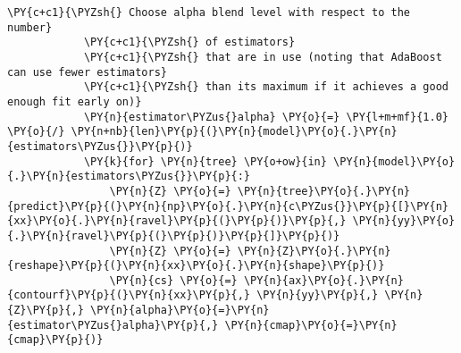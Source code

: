 \begin{Verbatim}[commandchars=\\\{\}]
            \PY{c+c1}{\PYZsh{} Choose alpha blend level with respect to the number}
            \PY{c+c1}{\PYZsh{} of estimators}
            \PY{c+c1}{\PYZsh{} that are in use (noting that AdaBoost can use fewer estimators}
            \PY{c+c1}{\PYZsh{} than its maximum if it achieves a good enough fit early on)}
            \PY{n}{estimator\PYZus{}alpha} \PY{o}{=} \PY{l+m+mf}{1.0} \PY{o}{/} \PY{n+nb}{len}\PY{p}{(}\PY{n}{model}\PY{o}{.}\PY{n}{estimators\PYZus{}}\PY{p}{)}
            \PY{k}{for} \PY{n}{tree} \PY{o+ow}{in} \PY{n}{model}\PY{o}{.}\PY{n}{estimators\PYZus{}}\PY{p}{:}
                \PY{n}{Z} \PY{o}{=} \PY{n}{tree}\PY{o}{.}\PY{n}{predict}\PY{p}{(}\PY{n}{np}\PY{o}{.}\PY{n}{c\PYZus{}}\PY{p}{[}\PY{n}{xx}\PY{o}{.}\PY{n}{ravel}\PY{p}{(}\PY{p}{)}\PY{p}{,} \PY{n}{yy}\PY{o}{.}\PY{n}{ravel}\PY{p}{(}\PY{p}{)}\PY{p}{]}\PY{p}{)}
                \PY{n}{Z} \PY{o}{=} \PY{n}{Z}\PY{o}{.}\PY{n}{reshape}\PY{p}{(}\PY{n}{xx}\PY{o}{.}\PY{n}{shape}\PY{p}{)}
                \PY{n}{cs} \PY{o}{=} \PY{n}{ax}\PY{o}{.}\PY{n}{contourf}\PY{p}{(}\PY{n}{xx}\PY{p}{,} \PY{n}{yy}\PY{p}{,} \PY{n}{Z}\PY{p}{,} \PY{n}{alpha}\PY{o}{=}\PY{n}{estimator\PYZus{}alpha}\PY{p}{,} \PY{n}{cmap}\PY{o}{=}\PY{n}{cmap}\PY{p}{)}


\end{Verbatim}
